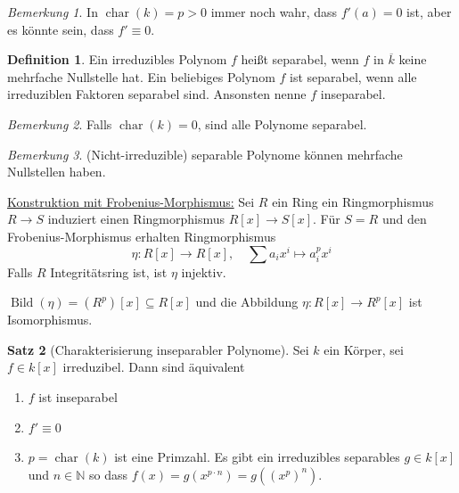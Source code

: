 \documentclass[12pt,parskip=full]{scrartcl}
\newcommand{\setN}{\mathbb{N}}
\newcommand{\heading}{\underline}
\theoremstyle{definition}
\newtheorem{theorem}{Satz}[section]
\newtheorem{definition}[theorem]{Definition}
\theoremstyle{remark}
\newtheorem*{remark}{Bemerkung}
\begin{document}
	\begin{remark}
		In $\operatorname{char}(k) = p > 0$ immer noch wahr, dass $f'(a) = 0$ ist, aber es könnte sein, dass $f' \equiv 0$.
	\end{remark}

	\begin{definition}
		Ein irreduzibles Polynom $f$ heißt separabel, wenn $f$ in $\overline{k}$ keine mehrfache Nullstelle hat. Ein beliebiges Polynom $f$ ist separabel, wenn alle irreduziblen Faktoren separabel sind. Ansonsten nenne $f$ inseparabel.
	\end{definition}

	\begin{remark}
		Falls $\operatorname{char}(k) = 0$, sind alle Polynome separabel.
	\end{remark}

	\begin{remark}
		(Nicht-irreduzible) separable Polynome können mehrfache Nullstellen haben.
	\end{remark}

	\heading{Konstruktion mit Frobenius-Morphismus:} Sei $R$ ein Ring ein Ringmorphismus $R \to S$ induziert einen Ringmorphismus $R[x] \to S[x]$. Für $S = R$ und den Frobenius-Morphismus erhalten Ringmorphismus
	\begin{equation*}
		\eta: R[x] \to R[x], \quad \sum a_i x^i \mapsto a_i^p x^i
	\end{equation*}
	Falls $R$ Integritätsring ist, ist $\eta$ injektiv.
	
	$\operatorname{Bild}(\eta) = (R^p)[x] \subseteq R[x]$ und die Abbildung $\eta: R[x] \to R^p[x]$ ist Isomorphismus.
	
	\begin{theorem}[Charakterisierung inseparabler Polynome]
		Sei $k$ ein Körper, sei $f \in k[x]$ irreduzibel. Dann sind äquivalent
		\begin{enumerate}
			\item $f$ ist inseparabel
			\item $f' \equiv 0$
			\item $p = \operatorname{char}(k)$ ist eine Primzahl. Es gibt ein irreduzibles separables $g \in k[x]$ und $n \in \setN$ so dass $f(x) = g(x^{p \cdot n}) = g((x^p)^n)$.
		\end{enumerate}
	\end{theorem}
\end{document}
